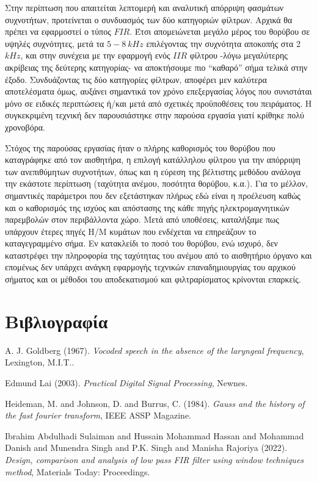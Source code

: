 \documentclass[breaklines=true, 12pt]{article}
\begin{document}
{{{Στην περίπτωση που απαιτείται λεπτομερή και αναλυτική απόρριψη φασμάτων
συχνοτήτων, προτείνεται ο συνδυασμός των δύο κατηγοριών φίλτρων. Αρχικά θα
πρέπει να εφαρμοστεί ο τύπος \(FIR\). Έτσι απομειώνεται μεγάλο μέρος του θορύβου
σε υψηλές συχνότητες, μετά τα \(5-8\ kHz\) επιλέγοντας την συχνότητα αποκοπής στα
2 \(kHz\), και στην συνέχεια με την εφαρμογή ενός \(IIR\) φίλτρου -λόγω μεγαλύτερης
ακρίβειας της δεύτερης κατηγορίας- να αποκτήσουμε πιο “καθαρό” σήμα τελικά στην
έξοδο. Συνδυάζοντας τις δύο κατηγορίες φίλτρων, αποφέρει μεν καλύτερα αποτελέσματα
όμως, αυξάνει σημαντικά τον χρόνο επεξεργασίας λόγος που συνιστάται μόνο σε
ειδικές περιπτώσεις ή/και μετά από σχετικές προϋποθέσεις του πειράματος. Η
συγκεκριμένη τεχνική δεν παρουσιάστηκε στην παρούσα εργασία γιατί κρίθηκε πολύ
χρονοβόρα.

Στόχος της παρούσας εργασίας ήταν ο πλήρης καθορισμός του θορύβου που
καταγράφηκε από τον αισθητήρα, η επιλογή κατάλληλου φίλτρου για την απόρριψη των
ανεπιθύμητων συχνοτήτων, όπως και η εύρεση της βέλτιστης μεθόδου ανάλογα την
εκάστοτε περίπτωση (ταχύτητα ανέμου, ποσότητα θορύβου, κ.α.). Για το μέλλον,
σημαντικές παράμετροι που δεν εξετάστηκαν πλήρως εδώ είναι η προέλευση καθώς και ο
καθορισμός της ισχύος και απόστασης της κάθε πηγής ηλεκτρομαγνητικών παρεμβολών
στον περιβάλλοντα χώρο. Μετά από υποθέσεις, καταλήξαμε πως υπάρχουν έτερες πηγές
Η/Μ κυμάτων που ενδέχεται να επηρεάζουν το καταγεγραμμένο σήμα. Εν κατακλείδι το
ποσό του θορύβου, ενώ ισχυρό, δεν καταστρέφει την πληροφορία της ταχύτητας του
ανέμου από το αισθητήριο όργανο και επομένως δεν υπάρχει ανάγκη εφαρμογής τεχνικών
επαναδημιουργίας του αρχικού σήματος και οι μέθοδοι του αποδεκατισμού και
φιλτραρίσματος κρίνονται επαρκείς.
\clearpage
\section{Βιβλιογραφία}
\label{sec:orgd015d6b}
\noindent
A. J. Goldberg (1967). \emph{Vocoded speech in the absence of the laryngeal frequency}, Lexington, M.I.T..

\noindent
Edmund Lai (2003). \emph{Practical Digital Signal Processing}, Newnes.

\noindent
Heideman, M. and Johnson, D. and Burrus, C. (1984). \emph{Gauss and the history of the fast fourier transform}, IEEE ASSP Magazine.

\noindent
Ibrahim Abdulhadi Sulaiman and Hussain Mohammad Hassan and Mohammad Danish and Munendra Singh and P.K. Singh and Manisha Rajoriya (2022). \emph{Design, comparison and analysis of low pass FIR filter using window techniques method}, Materials Today: Proceedings.

}}}
\end{document}
